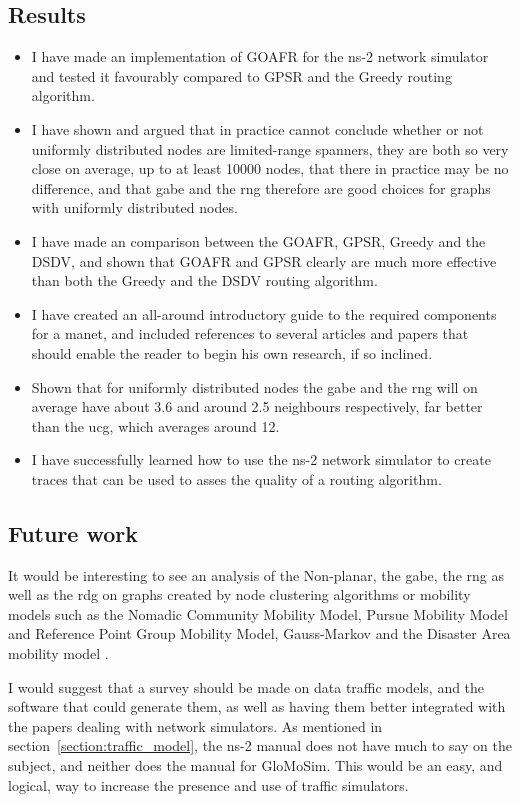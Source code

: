 \subsection{Results}
\begin{itemize}
\item I have made an implementation of GOAFR for the ns-2 network simulator and tested it favourably compared to GPSR and the Greedy routing algorithm.
\item I have shown and argued that in practice cannot conclude whether or not uniformly distributed nodes are limited-range spanners, they are both so very close on average, up to at least 10000 nodes, that there in practice may be no difference, and that \ac{gabe} and the \ac{rng} therefore are good choices for graphs with uniformly distributed nodes.
\item I have made an comparison between the GOAFR, GPSR, Greedy and the DSDV, and shown that GOAFR  and GPSR clearly are much more effective than both the Greedy and the DSDV routing algorithm.
\item I have created an all-around introductory guide to the required components for a \ac{manet}, and included references to several articles and papers that should enable the reader to begin his own research, if so inclined.
\item Shown that for uniformly distributed nodes the \ac{gabe} and the \ac{rng} will on average have about 3.6 and around 2.5 neighbours respectively, far better than the \ac{ucg}, which averages around 12.
\item I have successfully learned how to use the ns-2 network simulator to create traces that can be used to asses the quality of a routing algorithm.
\end{itemize}

\subsection{Future work}
\label{section:future_work}
It would be interesting to see an analysis of the Non-planar, the \ac{gabe}, the \ac{rng} as well as the \ac{rdg} on graphs created by node clustering algorithms or mobility models such as the Nomadic Community Mobility Model, Pursue Mobility Model and Reference Point Group Mobility Model, Gauss-Markov \cite{MobilityAdHocResearch} and the Disaster Area mobility model \cite{disasterArea}.

I would suggest that a survey should be made on data traffic models, and the software that could generate them, as well as having them better integrated with the papers dealing with network simulators. As mentioned in section~\ref{section:traffic_model}, the ns-2 manual does not have much to say on the subject, and neither does the manual for GloMoSim. This would be an easy, and logical, way to increase the presence and use of traffic simulators.


